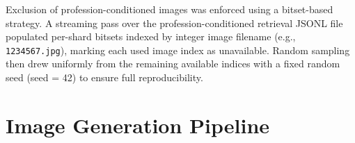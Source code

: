 Exclusion of profession-conditioned images was enforced using a
bitset-based strategy. A streaming pass over the profession-conditioned
retrieval JSONL file populated per-shard bitsets indexed by integer image
filename (e.g., \texttt{1234567.jpg}), marking each used image index as
unavailable. 
Random sampling then drew uniformly
from the remaining available indices with a fixed random seed (seed = 42)
to ensure full reproducibility.



\section{Image Generation Pipeline}

